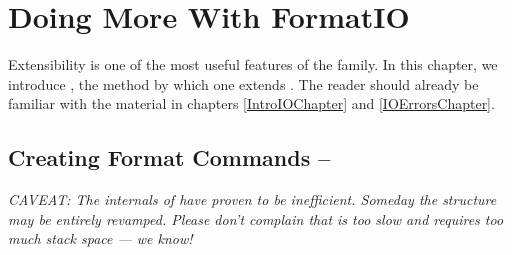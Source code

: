 %
%
%
%

\chapter{Doing More With FormatIO}
\label{FIOChapter}\label{FormatIOChapter}



Extensibility is one of the most useful features of 
the  family.  In this chapter, we
introduce , the method by which
one extends .  The reader should
already be familiar with the material in chapters \ref{IntroIOChapter}
and \ref{IOErrorsChapter}.

\section{Creating Format Commands -- }

{\em
CAVEAT: The internals of  have proven to be inefficient.
Someday the structure may be entirely revamped.  Please don't complain
that  is too slow and requires too much stack space ---
we know!
}

